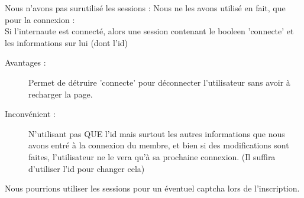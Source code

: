 
Nous n'avons pas surutilisé les sessions : Nous ne les avons utilisé en fait, que pour la connexion :\\

Si l'internaute est connecté, alors une session contenant le booleen 'connecte' et les informations sur lui (dont l'id)
\begin{description}
	\item[Avantages :] Permet de détruire 'connecte' pour déconnecter l'utilisateur sans avoir à recharger la page.
	\item[Inconvénient :] N'utilisant pas QUE l'id mais surtout les autres informations que nous avons entré à la connexion du membre, et bien si des modifications sont faites, l'utilisateur ne le vera qu'à sa prochaine connexion. (Il suffira d'utiliser l'id pour changer cela)
\end{description}

Nous pourrions utiliser les sessions pour un éventuel captcha lors de l'inscription.
